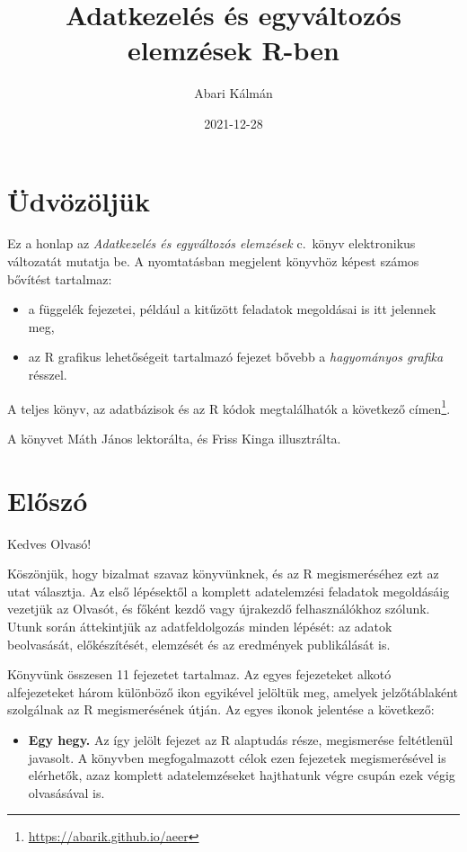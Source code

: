 \documentclass[
]{book}
\title{Adatkezelés és egyváltozós elemzések R-ben}
\author{Abari Kálmán}
\date{2021-12-28}
\DeclareRobustCommand{\href}[2]{#2\footnote{\url{#1}}}
\providecommand{\tightlist}{%
  \setlength{\itemsep}{0pt}\setlength{\parskip}{0pt}}
\newenvironment{rmdblock}[1]
  {\begin{shaded*}
  \begin{itemize}
  \renewcommand{\labelitemi}{
    \raisebox{-.7\height}[0pt][0pt]{
      {\setkeys{Gin}{width=3em,keepaspectratio}\texttt{[image: images/\#1]}}
    }
  }
  \item
  }
  {
  \end{itemize}
  \end{shaded*}
  }
\newenvironment{rmdlevel1}
  {\begin{rmdblock}{level1}}
  {\end{rmdblock}}
\begin{document}
\maketitle

{
\hypersetup{linkcolor=}
\setcounter{tocdepth}{1}
\tableofcontents
}
\hypertarget{uxfcdvuxf6zuxf6ljuxfck}{%
\chapter*{Üdvözöljük}\label{uxfcdvuxf6zuxf6ljuxfck}}

Ez a honlap az \emph{Adatkezelés és egyváltozós elemzések} c.~könyv elektronikus változatát mutatja be. A nyomtatásban megjelent könyvhöz képest számos bővítést tartalmaz:

\begin{itemize}
\tightlist
\item
  a függelék fejezetei, például a kitűzött feladatok megoldásai is itt jelennek meg,
\item
  az R grafikus lehetőségeit tartalmazó fejezet bővebb a \emph{hagyományos grafika} résszel.
\end{itemize}

A teljes könyv, az adatbázisok és az R kódok megtalálhatók a \href{https://abarik.github.io/aeer}{következő címen}.

A könyvet Máth János lektorálta, és Friss Kinga illusztrálta.

\hypertarget{eloszo}{%
\chapter*{Előszó}\label{eloszo}}

Kedves Olvasó!

Köszönjük, hogy bizalmat szavaz könyvünknek, és az R megismeréséhez ezt az utat választja. Az első lépésektől a komplett adatelemzési feladatok megoldásáig vezetjük az Olvasót, és főként kezdő vagy újrakezdő felhasználókhoz szólunk. Utunk során áttekintjük az adatfeldolgozás minden lépését: az adatok beolvasását, előkészítését, elemzését és az eredmények publikálását is.

Könyvünk összesen 11 fejezetet tartalmaz. Az egyes fejezeteket alkotó alfejezeteket három különböző ikon egyikével jelöltük meg, amelyek jelzőtáblaként szolgálnak az R megismerésének útján. Az egyes ikonok jelentése a következő:

\begin{rmdlevel1}
\textbf{Egy hegy.} Az így jelölt fejezet az R alaptudás része,
megismerése feltétlenül javasolt. A könyvben megfogalmazott célok ezen
fejezetek megismerésével is elérhetők, azaz komplett adatelemzéseket
hajthatunk végre csupán ezek végig olvasásával is.
\end{rmdlevel1}
\end{document}
